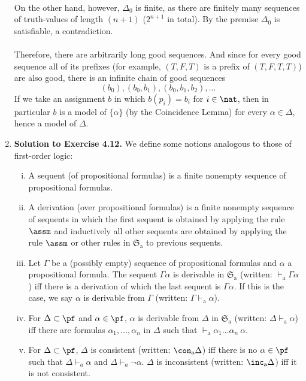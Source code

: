 \begin{enumerate}[1.]
\ \\
On the other hand, however, $\Delta_0$ is finite, as there are finitely many sequences of truth-values of length $(n + 1)$ ($2^{n + 1}$ in total). By the premise $\Delta_0$ is satisfiable, a contradiction.\\
\ \\
Therefore, there are arbitrarily long good sequences. And since for every good sequence all of its prefixes (for example, $(T, F, T)$ is a prefix of $(T, F, T, T)$) are also good, there is an infinite chain of good sequences
\[
(b_0), (b_0, b_1), (b_0, b_1, b_2), \ldots
\]
If we take an assignment $b$ in which $b(p_i) = b_i$ for $i \in \nat$, then in particular $b$ is a model of $\{ \alpha \}$ (by the Coincidence Lemma) for every $\alpha \in \Delta$, hence a model of $\Delta$.
%
\item \textbf{Solution to Exercise 4.12.} We define some notions analogous to those of first-order logic:
\begin{enumerate}[(i)]
\item A sequent (of propositional formulas) is a finite nonempty sequence of propositional formulas.
\item A derivation (over propositional formulas) is a finite nonempty sequence of sequents in which the first sequent is obtained by applying the rule $\assm$ and inductively all other sequents are obtained by applying the rule $\assm$ or other rules in $\mathfrak{S}_\mathrm{a}$ to previous sequents.
\item Let $\Gamma$ be a (possibly empty) sequence of propositional formulas and $\alpha$ a propositional formula. The sequent $\Gamma \alpha$ is derivable in $\mathfrak{S}_\mathrm{a}$ (written: $\vdash_\mathrm{a} \Gamma \alpha$) iff there is a derivation of which the last sequent is $\Gamma \alpha$. If this is the case, we say $\alpha$ is derivable from $\Gamma$ (written: $\Gamma \vdash_\mathrm{a} \alpha$).
\item For $\Delta \subset \pf$ and $\alpha \in \pf$, $\alpha$ is derivable from $\Delta$ in $\mathfrak{S}_\mathrm{a}$ (written: $\Delta \vdash_\mathrm{a} \alpha$) iff there are formulas $\alpha_1, \ldots, \alpha_n$ in $\Delta$ such that $\vdash_\mathrm{a} \alpha_1 \ldots \alpha_n \ \alpha$.
\item For $\Delta \subset \pf$, $\Delta$ is consistent (written: $\con_\mathrm{a} \Delta$) iff there is no $\alpha \in \pf$ such that $\Delta \vdash_a \alpha$ and $\Delta \vdash_a \neg\alpha$. $\Delta$ is inconsistent (written: $\inc_\mathrm{a} \Delta$) iff it is not consistent.

\end{enumerate}
\end{enumerate}
